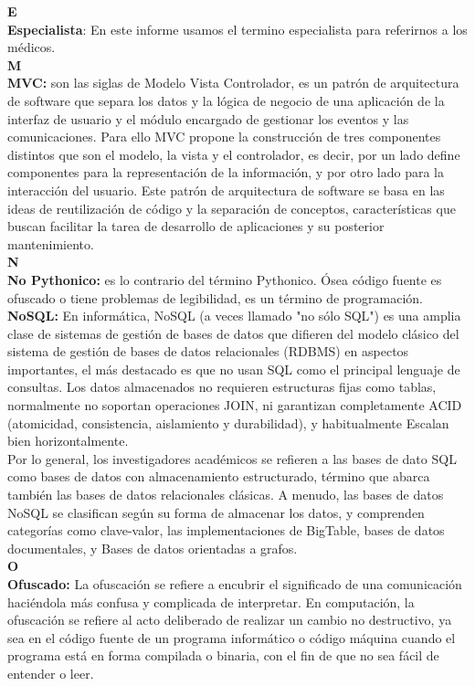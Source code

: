 {\LARGE \textbf{E}}
\\[0.1cm]
\textbf{Especialista}: En este informe usamos el termino especialista para referirnos a los médicos.
\\[0.5cm]

{\LARGE \textbf{M}}
\\[0.1cm]
\textbf{MVC:} son las siglas de Modelo Vista Controlador, es un patrón de arquitectura  de software que separa los datos y la lógica de negocio de una aplicación de la interfaz de usuario y el módulo encargado de gestionar los eventos y las comunicaciones. Para ello MVC propone la construcción de tres componentes distintos que son el modelo, la vista y el controlador, es decir, por un lado define componentes para la representación de la información, y por otro lado para la interacción del usuario. Este patrón de arquitectura de software se basa en las ideas de reutilización de código y la separación de conceptos, características que buscan facilitar la tarea de desarrollo  de aplicaciones y su posterior mantenimiento.
\\[0.5cm]

{\LARGE \textbf{N}}
\\[0.1cm]
\textbf{No Pythonico:} es lo contrario del término Pythonico. Ósea código fuente es ofuscado o tiene problemas de legibilidad, es un término de programación. 
\\[0.1cm]
\textbf{NoSQL:}
En informática, NoSQL (a veces llamado "no sólo SQL") es una amplia clase de sistemas de gestión de bases de datos que difieren del modelo clásico del sistema de gestión de bases de datos relacionales (RDBMS) en aspectos importantes, el más destacado es que no usan SQL como el principal lenguaje de consultas. Los datos almacenados no requieren estructuras fijas como tablas, normalmente no soportan operaciones JOIN, ni garantizan completamente ACID (atomicidad, consistencia, aislamiento y durabilidad), y habitualmente 
Escalan bien horizontalmente.
\\
Por lo general, los investigadores académicos se refieren a las bases de dato SQL como bases de datos con almacenamiento estructurado, término que abarca también las bases de datos relacionales clásicas. A menudo, las bases de datos NoSQL se clasifican según su forma de almacenar los datos, y comprenden categorías como clave-valor, las implementaciones de BigTable, bases de datos documentales, y Bases de datos orientadas a grafos.\\[0.5cm]

{\LARGE \textbf{O}}
\\[0.1cm]
\textbf{Ofuscado:} 
La ofuscación se refiere a encubrir el significado de una comunicación haciéndola más confusa y complicada de interpretar. En computación, la ofuscación se refiere al acto deliberado de realizar un cambio no destructivo, ya sea en el código fuente de un programa informático o código máquina cuando el programa está en forma compilada o binaria, con el fin de que no sea fácil de entender o leer.
\\[0.5cm]

